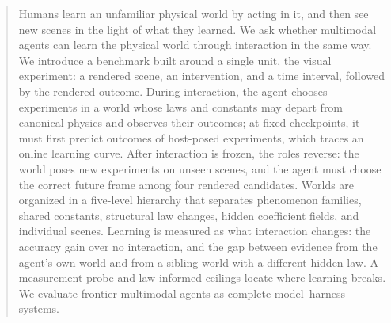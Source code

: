 \begin{abstract}
Humans learn an unfamiliar physical world by acting in it, and then see new scenes in the light of what they learned. We ask whether multimodal agents can learn the physical world through interaction in the same way. We introduce a benchmark built around a single unit, the visual experiment: a rendered scene, an intervention, and a time interval, followed by the rendered outcome. During interaction, the agent chooses experiments in a world whose laws and constants may depart from canonical physics and observes their outcomes; at fixed checkpoints, it must first predict outcomes of host-posed experiments, which traces an online learning curve. After interaction is frozen, the roles reverse: the world poses new experiments on unseen scenes, and the agent must choose the correct future frame among four rendered candidates. Worlds are organized in a five-level hierarchy that separates phenomenon families, shared constants, structural law changes, hidden coefficient fields, and individual scenes. Learning is measured as what interaction changes: the accuracy gain over no interaction, and the gap between evidence from the agent's own world and from a sibling world with a different hidden law. A measurement probe and law-informed ceilings locate where learning breaks. We evaluate frontier multimodal agents as complete model--harness systems. 
\end{abstract}
